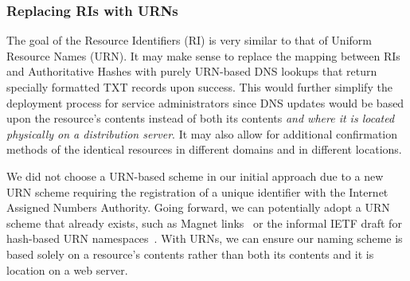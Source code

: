 \subsubsection{Replacing RIs with URNs}

The goal of the Resource Identifiers (RI) is very similar to that of Uniform
Resource Names (URN). It may make sense to replace the mapping between RIs and
Authoritative Hashes with purely URN-based DNS lookups that return specially
formatted TXT records upon success. This would further simplify the deployment
process for service administrators since DNS updates would be based upon the
resource's contents instead of both its contents \textit{and where it is located
physically on a distribution server}. It may also allow for additional
confirmation methods of the identical resources in different domains and in
different locations.

We did not choose a URN-based scheme in our initial approach due to a new URN
scheme requiring the registration of a unique identifier with the Internet
Assigned Numbers Authority. Going forward, we can potentially adopt a URN scheme
that already exists, such as Magnet links~\cite{MagnetLinks} or the informal
IETF draft for hash-based URN namespaces~\cite{draft-URN}. With URNs, we can
ensure our naming scheme is based solely on a resource's contents rather than
both its contents and it is location on a web server.
